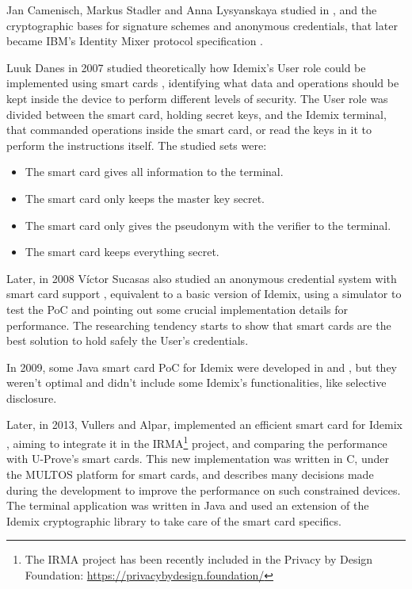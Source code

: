 

\hfil

Jan Camenisch, Markus Stadler and Anna Lysyanskaya studied in \citep{Camenisch:GroupSig}, \citep{Camenisch:AnonCred} and \citep{camenisch2002signature} the cryptographic bases for signature schemes and anonymous credentials, that later became IBM's Identity Mixer protocol specification \citep{idemixSpec}.


Luuk Danes in 2007 studied theoretically how Idemix's User role could be implemented using  
smart cards \citep{luuk}, identifying what data and operations should be kept inside the device to perform different levels of security. The User role was divided between the smart card, holding secret keys, and the Idemix terminal, that commanded operations inside the smart card, or read the keys in it to perform the instructions itself. The studied sets were:
\begin{itemize}
	\item The smart card gives all information to the terminal.
	\item The smart card only keeps the master key secret.
	\item The smart card only gives the pseudonym with the verifier to the terminal.
	\item The smart card keeps everything secret.
\end{itemize}

Later, in 2008 Víctor Sucasas also studied an anonymous credential system with smart card support \citep{sucasas}, equivalent to a basic version of Idemix, using a simulator to test the PoC and pointing out some crucial implementation details for performance. The researching tendency starts to show that smart cards are the best solution to hold safely the User's credentials.

In 2009, some Java smart card PoC for Idemix were developed in \citep{javaIdemix1} and \citep{javaIdemix2}, but they weren't optimal and didn't include some Idemix's functionalities, like selective disclosure.

Later, in 2013, Vullers and Alpar, implemented an efficient smart card for Idemix \citep{vullers2013efficient}, aiming to integrate it in the IRMA\footnote{The IRMA project has been recently included in the Privacy by Design Foundation: \url{https://privacybydesign.foundation/}} project, and comparing the performance with U-Prove's smart cards. This new implementation was written in C, under the MULTOS platform for smart cards, and describes many decisions made during the development to improve the performance on such constrained devices. The terminal application was written in Java and used an extension of the Idemix cryptographic library to take care of the smart card specifics.


